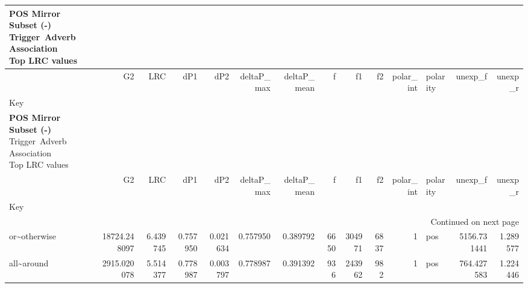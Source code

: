 
\begin{longtable}[ht]{lrrrrrrrrrrlrr}
\caption{\textbf{POS Mirror Subset (-)}\\Trigger~Adverb Association\\Top LRC values} \label{trig-adv-AMtop-POSMir} \\
\toprule
 & G2 & LRC & dP1 & dP2 & deltaP\_max & deltaP\_mean & f & f1 & f2 & polar\_int & polarity & unexp\_f & unexp\_r \\
Key &  &  &  &  &  &  &  &  &  &  &  &  &  \\
\midrule
\endfirsthead
\caption[]{\textbf{POS Mirror Subset (-)}\\Trigger~Adverb Association\\Top LRC values} \\
\toprule
 & G2 & LRC & dP1 & dP2 & deltaP\_max & deltaP\_mean & f & f1 & f2 & polar\_int & polarity & unexp\_f & unexp\_r \\
Key &  &  &  &  &  &  &  &  &  &  &  &  &  \\
\midrule
\endhead
\midrule
\multicolumn{14}{r}{Continued on next page} \\
\midrule
\endfoot
\bottomrule
\endlastfoot
or\textasciitilde otherwise & {\cellcolor[HTML]{DBC8E2}} \color[HTML]{000000} 18724.248097 & {\cellcolor[HTML]{67001F}} \color[HTML]{F1F1F1} 6.439745 & {\cellcolor[HTML]{720027}} \color[HTML]{F1F1F1} 0.757950 & {\cellcolor[HTML]{E4DBEC}} \color[HTML]{000000} 0.021634 & {\cellcolor[HTML]{720027}} \color[HTML]{F1F1F1} 0.757950 & {\cellcolor[HTML]{690020}} \color[HTML]{F1F1F1} 0.389792 & {\cellcolor[HTML]{E5DCEC}} \color[HTML]{000000} 6650 & {\cellcolor[HTML]{6C0022}} \color[HTML]{F1F1F1} 304971 & {\cellcolor[HTML]{E9E3F0}} \color[HTML]{000000} 6837 & {\cellcolor[HTML]{F7F4F9}} \color[HTML]{000000} 1 & pos & {\cellcolor[HTML]{E3D8EA}} \color[HTML]{000000} 5156.731441 & {\cellcolor[HTML]{E72989}} \color[HTML]{F1F1F1} 1.289577 \\
all\textasciitilde around & {\cellcolor[HTML]{F3F0F7}} \color[HTML]{000000} 2915.020078 & {\cellcolor[HTML]{D1155D}} \color[HTML]{F1F1F1} 5.514377 & {\cellcolor[HTML]{67001F}} \color[HTML]{F1F1F1} 0.778987 & {\cellcolor[HTML]{F4F1F7}} \color[HTML]{000000} 0.003797 & {\cellcolor[HTML]{67001F}} \color[HTML]{F1F1F1} 0.778987 & {\cellcolor[HTML]{67001F}} \color[HTML]{F1F1F1} 0.391392 & {\cellcolor[HTML]{F4F1F7}} \color[HTML]{000000} 936 & {\cellcolor[HTML]{BD0C50}} \color[HTML]{F1F1F1} 243962 & {\cellcolor[HTML]{F6F3F8}} \color[HTML]{000000} 982 & {\cellcolor[HTML]{F7F4F9}} \color[HTML]{000000} 1 & pos & {\cellcolor[HTML]{F4F1F7}} \color[HTML]{000000} 764.427583 & {\cellcolor[HTML]{DB6FB5}} \color[HTML]{F1F1F1} 1.224446 \\

\end{longtable}

